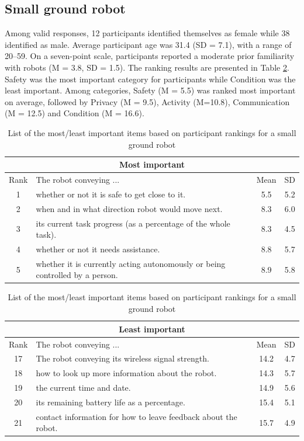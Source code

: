 \documentclass[letterpaper, 10 pt, conference]{ieeeconf}  %
\begin{document}
\subsection{Small ground robot}
Among valid responses, 12 participants identified themselves as female while 38 identified as male. Average participant age was 31.4 (SD = 7.1), with a range of 20--59. On a seven-point scale, participants reported a moderate prior familiarity with robots (M = 3.8, SD = 1.5). The ranking results are presented in Table \ref{table:turtlebot}. Safety was the most important category for participants while Condition was the least important. Among categories, Safety (M = 5.5) was ranked most important on average, followed by Privacy (M = 9.5), Activity (M=10.8), Communication (M = 12.5) and Condition (M = 16.6).
    
\begin {table}[h]
\begin{center}
\caption{List of the most/least important items based on participant rankings for a small ground robot}
\label{table:turtlebot}
\vspace*{0.2 cm}
\begin{tabular}{|c|p{150pt}|c|c|}
 \hline
 \multicolumn{4}{|c|}{Most important} \\
 \hline
  Rank & The robot conveying ... & Mean & SD \\
 \hline
 \rowcolor{Gray}
1 & whether or not it is safe to get close to it. & 5.5 & 5.2\\
\hline
2 & when and in what direction robot would move next. & 8.3 & 6.0\\
\hline
3 & its current task progress (as a percentage of the whole task). & 8.3 & 4.5\\
\hline
4 & whether or not it needs assistance. & 8.8 & 5.7\\
\hline
5 & whether it is currently acting autonomously or being controlled by a person. & 8.9 & 5.8\\
\hline
\end{tabular}

\vspace*{0.5 cm}

\begin{tabular}{|c|p{150pt}|c|c|}
 \hline
  \multicolumn{4}{|c|}{Least important} \\
 \hline
  Rank & The robot conveying ... & Mean & SD \\
 \hline
17 & The robot conveying its wireless signal strength. & 14.2 & 4.7\\
\hline
18 & how to look up more information about the robot. & 14.3 & 5.7\\
\hline
19 & the current time and date. & 14.9 & 5.6\\
\hline
20 & its remaining battery life as a percentage. & 15.4 & 5.1\\
\hline
21 & contact information for how to leave feedback about the robot. & 15.7 & 4.9\\
\hline
\end{tabular}
\end{center}
\end{table}
\end{document}
